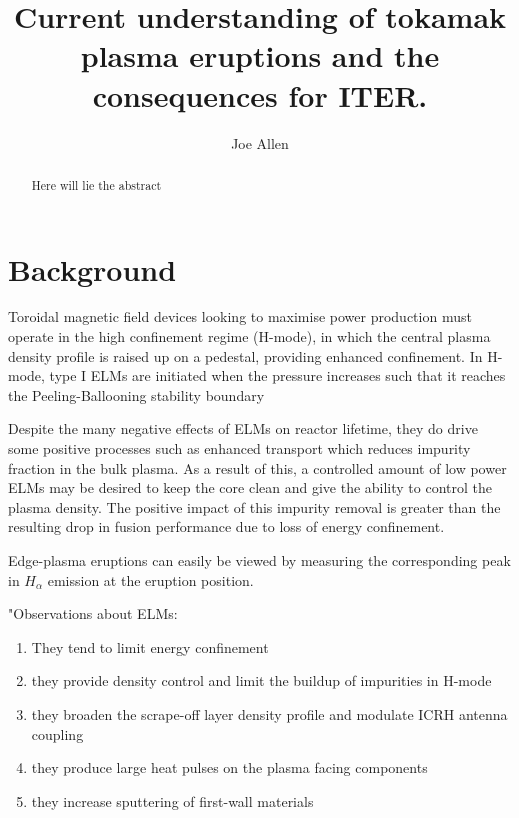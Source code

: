 \documentclass[aps,prl,reprint]{revtex4-1}
\begin{document}
\title{Current understanding of tokamak plasma eruptions and the consequences for ITER.}
\author{Joe Allen}

\begin{abstract}
  Here will lie the abstract
\end{abstract}
  
\maketitle

\section{Background}\label{sec:Bg}
Toroidal magnetic field devices looking to maximise power production must operate in the high confinement regime (H-mode), in which the central plasma density profile is raised up on a pedestal, providing enhanced confinement.\cite{Wagner2007}
In H-mode, type I ELMs are initiated when the pressure increases such that it reaches the Peeling-Ballooning stability boundary


Despite the many negative effects of ELMs on reactor lifetime, they do drive some positive processes such as enhanced transport which reduces impurity fraction in the bulk plasma. As a result of this, a controlled amount of low power ELMs may be desired to keep the core clean and give the ability to control the plasma density.\citep{Hill1997} The positive impact of this impurity removal is greater than the resulting drop in fusion performance due to loss of energy confinement.\cite{Connor2008}

Edge-plasma eruptions can easily be viewed by measuring the corresponding peak in $H_{\alpha}$ emission at the eruption position.\citep{Hill1997}

"Observations about ELMs: 
\begin{enumerate}
\item They tend to limit energy confinement
\item they provide density control and limit the buildup of impurities in H-mode
\item they broaden the scrape-off layer density profile and modulate ICRH antenna coupling
\item they produce large heat pulses on the plasma facing components 
\item they increase sputtering of first-wall materials
\end{enumerate}
\end{document}
